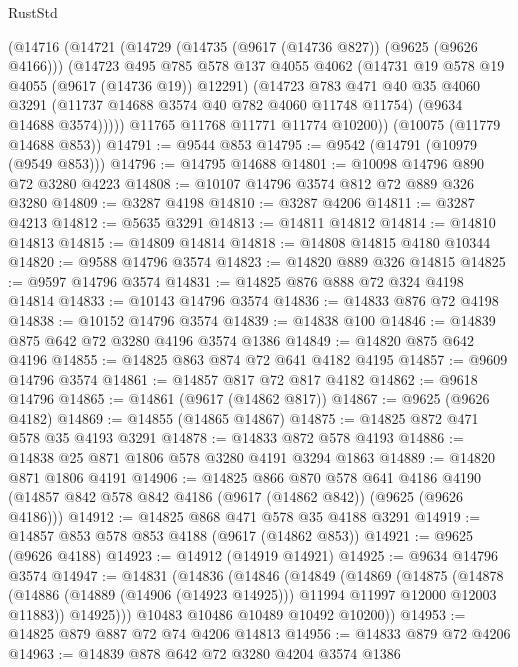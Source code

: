 \begin{lexlean}{RustStd}
\begin{coremodule}
{\begin{coremodule}
{{{{{{{{{{{{{{{{{{{{{{{{{{{{{{{{{      (@14716
        (@14721
          (@14729
            (@14735 (@9617 (@14736 @827)) (@9625 (@9626 @4166)))
            (@14723
              @495
              @785
              @578
              @137
              @4055
              @4062
              (@14731 @19 @578 @19 @4055 (@9617 (@14736 @19)) @12291)
              (@14723
                @783
                @471
                @40
                @35
                @4060
                @3291
                (@11737 @14688 @3574 @40 @782 @4060 @11748 @11754)
                (@9634 @14688 @3574)))))
        @11765
        @11768
        @11771
        @11774
        @10200))
    (@10075 (@11779 @14688 @853))
@14791 := @9544 @853
@14795 := @9542 (@14791 (@10979 (@9549 @853)))
@14796 := @14795 @14688
@14801 := @10098 @14796 @890 @72 @3280 @4223
@14808 := @10107 @14796 @3574 @812 @72 @889 @326 @3280
@14809 := @3287 @4198
@14810 := @3287 @4206
@14811 := @3287 @4213
@14812 := @5635 @3291
@14813 := @14811 @14812
@14814 := @14810 @14813
@14815 := @14809 @14814
@14818 := @14808 @14815 @4180 @10344
@14820 := @9588 @14796 @3574
@14823 := @14820 @889 @326 @14815
@14825 := @9597 @14796 @3574
@14831 := @14825 @876 @888 @72 @324 @4198 @14814
@14833 := @10143 @14796 @3574
@14836 := @14833 @876 @72 @4198
@14838 := @10152 @14796 @3574
@14839 := @14838 @100
@14846 := @14839 @875 @642 @72 @3280 @4196 @3574 @1386
@14849 := @14820 @875 @642 @4196
@14855 := @14825 @863 @874 @72 @641 @4182 @4195
@14857 := @9609 @14796 @3574
@14861 := @14857 @817 @72 @817 @4182
@14862 := @9618 @14796
@14865 := @14861 (@9617 (@14862 @817))
@14867 := @9625 (@9626 @4182)
@14869 := @14855 (@14865 @14867)
@14875 := @14825 @872 @471 @578 @35 @4193 @3291
@14878 := @14833 @872 @578 @4193
@14886 := @14838 @25 @871 @1806 @578 @3280 @4191 @3294 @1863
@14889 := @14820 @871 @1806 @4191
@14906 := @14825
    @866
    @870
    @578
    @641
    @4186
    @4190
    (@14857 @842 @578 @842 @4186 (@9617 (@14862 @842)) (@9625 (@9626 @4186)))
@14912 := @14825 @868 @471 @578 @35 @4188 @3291
@14919 := @14857 @853 @578 @853 @4188 (@9617 (@14862 @853))
@14921 := @9625 (@9626 @4188)
@14923 := @14912 (@14919 @14921)
@14925 := @9634 @14796 @3574
@14947 := @14831
    (@14836
      (@14846
        (@14849
          (@14869
            (@14875
              (@14878 (@14886 (@14889 (@14906 (@14923 @14925))) @11994 @11997 @12000 @12003 @11883))
              @14925)))
        @10483
        @10486
        @10489
        @10492
        @10200))
@14953 := @14825 @879 @887 @72 @74 @4206 @14813
@14956 := @14833 @879 @72 @4206
@14963 := @14839 @878 @642 @72 @3280 @4204 @3574 @1386
}}}}}}}}}}}}}}}}}}}}}}}}}}}}}}}}}
\end{coremodule}}
\end{coremodule}
\end{lexlean}
